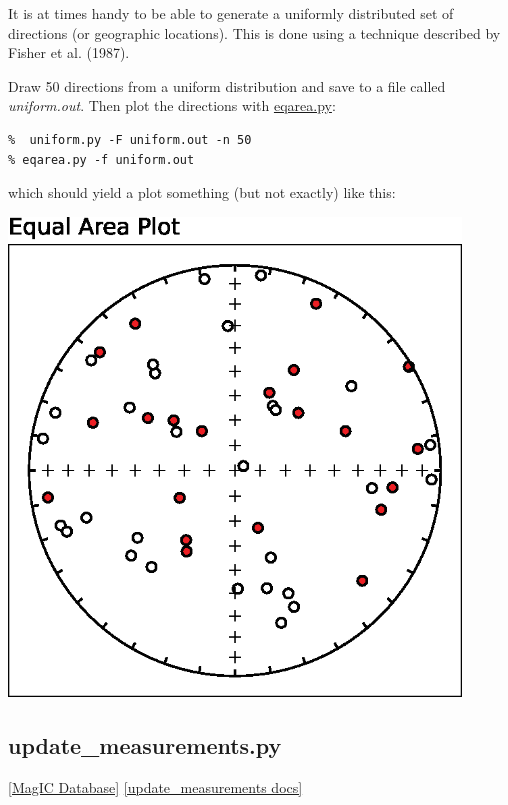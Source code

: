 \documentclass[11pt]{book}
\begin{document}
{It is at times handy to be able to generate a uniformly distributed set of directions (or geographic locations).  This is done using a technique described by Fisher et al. (1987).

Draw 50 directions from a uniform distribution and save to a file called {\it uniform.out}.  Then plot the directions with \href{#eqarea.py}{eqarea.py}:

\begin{verbatim}
%  uniform.py -F uniform.out -n 50
% eqarea.py -f uniform.out
\end{verbatim}

which should yield a plot something (but not exactly) like this:

\includegraphics[width=12cm]{EPSfiles/uniform.eps}



\subsection{update\_measurements.py}
\href{#MagICDatabase}{[MagIC Database]}
\href{https://github.com/PmagPy/PmagPy/blob/master/programs/update_measurements.py}{[update\_measurements docs]}

}
\end{document}
